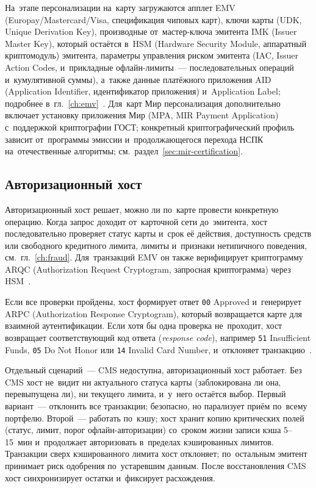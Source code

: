 На~этапе персонализации на~карту загружаются апплет EMV
(Europay/\allowbreak Mastercard/\allowbreak Visa, спецификация чиповых карт), ключи карты (UDK,
Unique Derivation Key), производные от~мастер-ключа эмитента IMK (Issuer Master
Key), который остаётся в~HSM (Hardware Security Module, аппаратный криптомодуль)
эмитента, параметры управления риском эмитента
(IAC, Issuer Action Codes, и~прикладные офлайн-лимиты~--- последовательных
операций и~кумулятивной суммы), а~также данные платёжного приложения AID
(Application Identifier, идентификатор приложения) и~Application Label;
подробнее в~гл.~\ref{ch:emv}~\cite{emvco-book2,emvco-book3,emvco-book4,aws-payment-cryptography-terminology}. Для~карт Мир
персонализация дополнительно включает установку приложения Мир (MPA, MIR
Payment Application) с~поддержкой криптографии ГОСТ; конкретный
криптографический профиль зависит от~программы эмиссии и~продолжающегося
перехода НСПК на~отечественные алгоритмы;
см.~раздел~\ref{sec:mir-certification}.

\subsection*{Авторизационный хост}

Авторизационный хост решает, можно ли по~карте провести конкретную операцию.
Когда запрос доходит от~карточной сети до~эмитента, хост последовательно
проверяет статус карты и~срок её действия, доступность средств или свободного
кредитного лимита, лимиты и~признаки нетипичного поведения,
см.~гл.~\ref{ch:fraud}. Для~транзакций EMV он также верифицирует
криптограмму ARQC (Authorization Request Cryptogram, запросная криптограмма)
через HSM~\cite{emvco-book2,emvco-book3}.

Если все проверки пройдены, хост формирует ответ \texttt{00} Approved
и~генерирует ARPC (Authorization Response Cryptogram), который возвращается
карте для взаимной аутентификации. Если хотя бы одна проверка не~проходит, хост
возвращает соответствующий код ответа (\textit{response code}), например \texttt{51} Insufficient
Funds, \texttt{05} Do Not Honor или \texttt{14} Invalid Card Number,
и~отклоняет транзакцию~\cite{emvco-book3,fis-iso8583-guide-2023}.

Отдельный сценарий~--- CMS недоступна, авторизационный хост работает. Без CMS
хост не~видит ни актуального статуса карты (заблокирована ли она, перевыпущена
ли), ни текущего лимита, и~у~него остаётся выбор. Первый вариант~--- отклонить
все транзакции; безопасно, но парализует приём по~всему портфелю. Второй~---
работать по~кэшу; хост хранит копию критических полей (статус, лимит, порог
офлайн-авторизации) со~сроком жизни записи кэша 5--15~мин и~продолжает
авторизовать в~пределах кэшированных лимитов. Транзакции сверх кэшированного
лимита хост отклоняет; по~остальным эмитент принимает риск одобрения
по~устаревшим данным. После восстановления CMS хост синхронизирует остатки
и~фиксирует расхождения.

